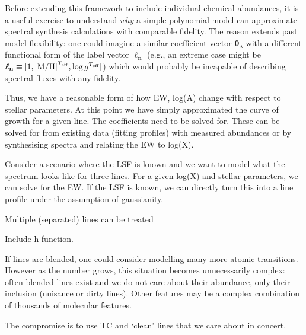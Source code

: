 \documentclass[useAMS,usenatbib]{mn2e}
\newcommand\lv{\mathbf{\boldsymbol\ell_n}}
\newcommand\cv{{\boldsymbol\theta}_\lambda}
\begin{document}

Before extending this framework to include individual chemical abundances, it is
a useful exercise to understand \textit{why} a simple polynomial model can 
approximate spectral synthesis calculations with comparable fidelity. The reason
extends past model flexibility: one could imagine a similar coefficient vector
$\cv$ with a different functional form of the label vector $\lv$ (e.g., an
extreme case might be $\lv \equiv [1, {\rm [M/H]}^{T_{\rm eff}},
\log{g}^{T_{\rm eff}}]$) which would probably be incapable of describing
spectral fluxes with any fidelity.






Thus, we have a reasonable form of how EW, log(A) change with respect to
stellar parameters. At this point we have simply approximated the curve of growth
for a given line. The coefficients need to be solved for. These can be solved for
from existing data (fitting profiles) with measured abundances or by synthesising
spectra and relating the EW to log(X).


Consider a scenario where the LSF is known and we want to model what the
spectrum looks like for three lines. For a given log(X) and stellar parameters,
we can solve for the EW. If the LSF is known, we can directly turn this into a
line profile under the assumption of gaussianity.

Multiple (separated) lines can be treated

Include h function.

If lines are blended, one could consider modelling many more atomic transitions.
However as the number grows, this situation becomes unnecessarily complex:
often blended lines exist and we do not care about their abundance, only their
inclusion (nuisance or dirty lines). Other features may be a complex combination
of thousands of molecular features.

The compromise is to use TC and `clean' lines that we care about in concert.
\end{document}
